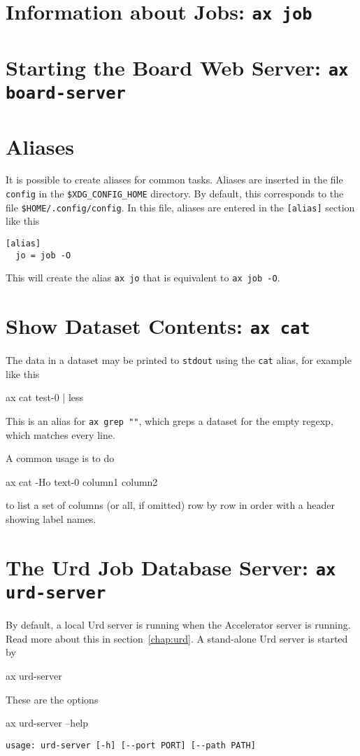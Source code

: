 \begin{shell}
\section{Information about Jobs: \texttt{ax job}}



\section{Starting the Board Web Server: \texttt{ax board-server}}




\section{Aliases}
It is possible to create aliases for common tasks.  Aliases are
inserted in the file \texttt{config} in the \texttt{\$XDG\_CONFIG\_HOME}
directory.  By default, this corresponds to the file \texttt{\$HOME/.config/config}.
In this file, aliases are entered in the \texttt{[alias]} section like this
\begin{verbatim}
[alias]
  jo = job -O
\end{verbatim}
This will create the alias \texttt{ax jo} that is equivalent to
\texttt{ax job -O}.



\section{Show Dataset Contents: \texttt{ax cat}}
The data in a dataset may be printed to \texttt{stdout} using the
\texttt{cat} alias, for example like this
\begin{shell}
ax cat test-0 | less
\end{shell}
This is an alias for \texttt{ax grep ""}, which greps a dataset for the
empty regexp, which matches every line.

A common usage is to do
\begin{shell}
ax cat -Ho text-0 column1 column2
\end{shell}
to list a set of columns (or all, if omitted) row by row in order with
a header showing label names.



\section{The Urd Job Database Server: \texttt{ax urd-server}}
By default, a local Urd server is running when the Accelerator server
is running.  Read more about this in section~\ref{chap:urd}.  A
stand-alone Urd server is started by
\begin{shell}
ax urd-server
\end{shell}
These are the options
\begin{shell}
ax urd-server --help
\end{shell}
\begin{snugshade}
\begin{verbatim}
usage: urd-server [-h] [--port PORT] [--path PATH]


\end{verbatim}
\end{snugshade}
\end{shell}
